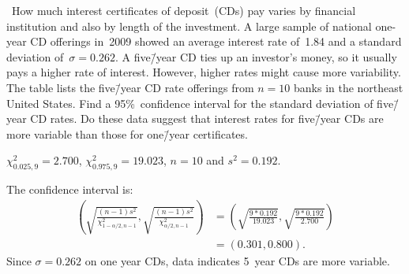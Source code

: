 \begin{problem}
  ~How much interest certificates of deposit~(CDs) pay varies by financial institution and also by length of the investment.  A large sample of national one-year CD offerings in~2009 showed an average interest rate of~1.84 and a standard deviation of~${\sigma  = 0.262}$.  A five\=/year CD ties up an investor's money, so it usually pays a higher rate of interest.  However, higher rates might cause more variability.  The table lists the five\=/year CD rate offerings from ${n = 10}$ banks in the northeast United States.  Find a 95\%~confidence interval for the standard deviation of five\=/year CD rates.  Do these data suggest that interest rates for five\=/year CDs are more variable than those for one\=/year certificates.
\end{problem}

${\chi_{0.025,9}^2 = 2.700}$, ${\chi_{0.975,9}^2 = 19.023}$, ${n =10}$ and ${s^2 = 0.192}$.

The confidence interval is:
\begin{align}
  \left(\sqrt{\frac{(n-1)s^2}{\chi^{2}_{1-\alpha/2,n-1}}},\sqrt{\frac{(n-1)s^2}{\chi^{2}_{\alpha/2,n-1}}}\right) &= \left(\sqrt{\frac{9 * 0.192}{19.023}}, \sqrt{\frac{9 * 0.192}{2.700}}\right) \\
                                                                                                          &= \left(0.301,0.800\right)\text{.}
\end{align}
Since ${\sigma = 0.262}$ on one year CDs, data indicates 5~year CDs are more variable.
